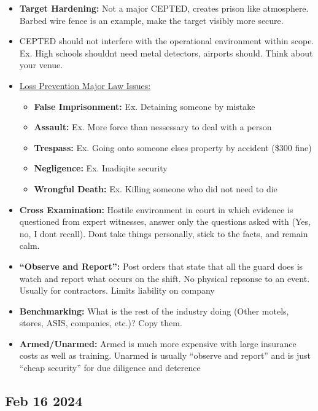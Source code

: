 \documentclass[12pt]{article}
\begin{document}
\begin{itemize}
		  \item \textbf{Target Hardening:} Not a major CEPTED, creates prison like atmosphere. Barbed
					 wire fence is an example, make the target visibly more secure.
		  \item CEPTED should not interfere with the operational environment within scope. Ex. 
					 High schools shouldnt need metal detectors, airports should. Think about your
					 venue.
		  \item \underline{Loss Prevention Major Law Issues:}
					 \begin{itemize}
								\item \textbf{False Imprisonment:} Ex. Detaining someone by mistake
								\item \textbf{Assault:} Ex. More force than nessessary to deal with a person
								\item \textbf{Trespass:} Ex. Going onto someone elses property by accident (\$300 fine)
								\item \textbf{Negligence:} Ex. Inadiqite security
								\item \textbf{Wrongful Death:} Ex. Killing someone who did not need to die
					 \end{itemize}
		  \item \textbf{Cross Examination:} Hostile environment in court in which evidence is questioned from
					 expert witnesses, answer only the questions asked with (Yes, no, I dont recall). Dont
					 take things personally, stick to the facts, and remain calm.
		  \item \textbf{``Observe and Report'':} Post orders that state that all the guard does is 
					 watch and report what occurs on the shift. No physical repsonse to an event. Usually
					 for contractors. Limits liability on company
		  \item \textbf{Benchmarking:} What is the rest of the industry doing (Other motels,
					 stores, ASIS, companies, etc.)? Copy them.
		  \item \textbf{Armed/Unarmed:} Armed is much more expensive with large insurance costs as well
					 as training. Unarmed is usually ``observe and report'' and is just ``cheap security''
					 for due diligence and deterence
\end{itemize}

\subsection*{Feb 16 2024}
\end{document}
